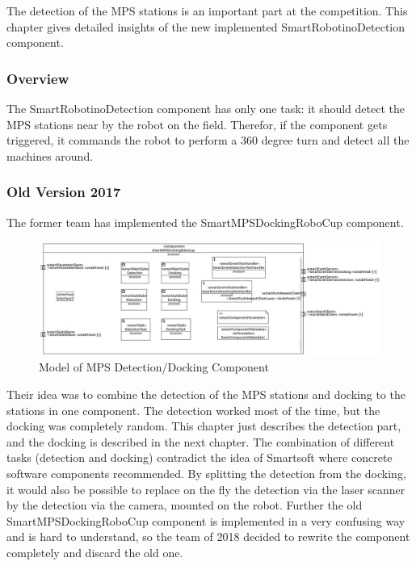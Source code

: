 The detection of the MPS stations is an important part at the competition. This chapter gives detailed insights of the new implemented SmartRobotinoDetection component. 


\subsubsection{Overview}

The SmartRobotinoDetection component has only one task: it should detect the MPS stations near by the robot on the field. Therefor, if the component gets triggered, it commands the robot to perform a 360 degree turn and detect all the machines around.

\subsubsection{Old Version 2017}
The former team has implemented the SmartMPSDockingRoboCup component. 

\begin{figure}[h]
\centering
\includegraphics[scale=0.4]{pic/SmartMPSDockingRoboCup.JPG}
\caption{Model of MPS Detection/Docking Component}
\label{fig:dockingold_overview}
\end{figure}

Their idea was to combine the detection of the MPS stations and docking to the stations in one component. The detection worked most of the time, but the docking was completely random. This chapter just describes the detection part, and the docking is described in the next chapter. 
The combination of different tasks (detection and docking) contradict the idea of Smartsoft where concrete software components recommended. By splitting the detection from the docking, it would also be possible to replace on the fly the detection via the laser scanner by the detection via the camera, mounted on the robot.
Further the old SmartMPSDockingRoboCup component is implemented in a very confusing way and is hard to understand, so the team of 2018 decided to rewrite the component completely and discard the old one.


